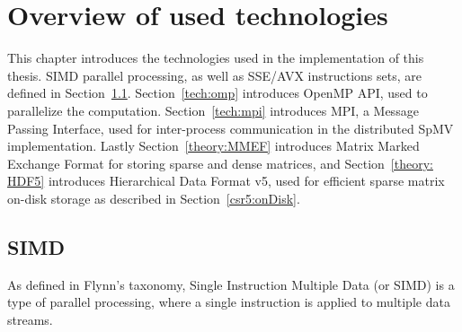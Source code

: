 \documentclass[thesis=M,english]{FITthesis}[2019/12/23]
\begin{document}
\chapter{Overview of used technologies}\label{tech}

This chapter introduces the technologies used in the implementation of this thesis.
SIMD parallel processing, as well as SSE/AVX instructions sets, are defined in Section~\ref{tech:simd}.
Section~\ref{tech:omp} introduces OpenMP API, used to parallelize the computation.
Section~\ref{tech:mpi} introduces MPI, a Message Passing
Interface, used for inter-process communication in the distributed SpMV implementation.  Lastly
Section~\ref{theory:MMEF} introduces Matrix Marked Exchange Format for storing sparse and dense matrices,
and Section~\ref{theory: HDF5} introduces Hierarchical Data Format v5, used for efficient sparse matrix
on-disk storage as described in Section~\ref{csr5:onDisk}.


\section{SIMD}\label{tech:simd}

As defined in Flynn's taxonomy, Single Instruction Multiple Data (or SIMD) is a type of parallel
processing, where a single instruction is applied to multiple data streams.
\end{document}
